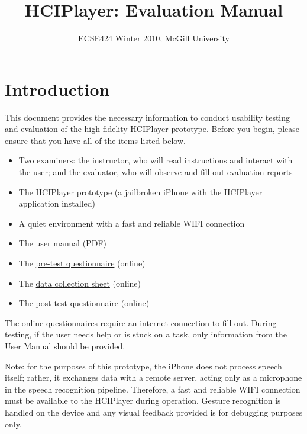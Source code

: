\documentclass[12pt,letterpaper]{article}
\begin{document}
\title{HCIPlayer: Evaluation Manual}
\author{ECSE424 Winter 2010, McGill University}
\renewcommand{\today}{Updated: Monday, March 8th, 2010}
\maketitle

\section{Introduction}

This document provides the necessary information to conduct usability testing and evaluation of the high-fidelity HCIPlayer prototype. Before you begin, please ensure that you have all of the items listed below.

\begin{itemize}
\item Two examiners: the instructor, who will read instructions and interact with the user; and the evaluator, who will observe and fill out evaluation reports
\item The HCIPlayer prototype (a jailbroken iPhone with the HCIPlayer application installed)
\item A quiet environment with a fast and reliable WIFI connection
\item The \href{http://www.ece.mcgill.ca/~scormi3/hci/docs/user-manual.pdf}{user manual} (PDF)
\item The \href{http://fluidsurveys.com/s/hciplayer-pretest/}{pre-test questionnaire} (online)
\item The \href{http://fluidsurveys.com/s/hciplayer-datacollectionsheet/}{data collection sheet} (online)
\item The \href{http://fluidsurveys.com/s/hciplayer-posttest/}{post-test questionnaire} (online)
\end{itemize}

The online questionnaires require an internet connection to fill out. During testing, if the user needs help or is stuck on a task, only information from the User Manual should be provided.

Note: for the purposes of this prototype, the iPhone does not process speech itself; rather, it exchanges data with a remote server, acting only as a microphone in the speech recognition pipeline. Therefore, a fast and reliable WIFI connection must be available to the HCIPlayer during operation. Gesture recognition is handled on the device and any visual feedback provided is for debugging purposes only.
\end{document}
